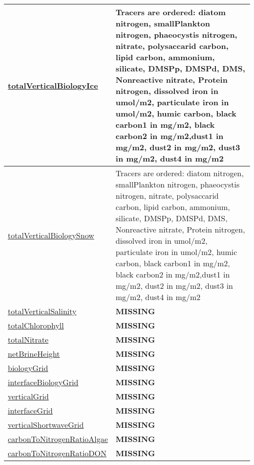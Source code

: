 {\begin{center}
\begin{longtable}{| p{2.0in} | p{4.0in} |}
    \hline
    \hyperref[subsec:var_sec_biogeochemistry_totalVerticalBiologyIce]{totalVerticalBiologyIce} & Tracers are ordered: diatom nitrogen, smallPlankton nitrogen, phaeocystis nitrogen, nitrate, polysaccarid carbon, lipid carbon, ammonium, silicate, DMSPp, DMSPd, DMS, Nonreactive nitrate, Protein nitrogen, dissolved iron in umol/m2, particulate iron in umol/m2, humic carbon, black carbon1 in mg/m2, black carbon2 in mg/m2,dust1 in mg/m2, dust2 in mg/m2, dust3 in mg/m2, dust4 in mg/m2 \\
    \hline
    \hyperref[subsec:var_sec_biogeochemistry_totalVerticalBiologySnow]{totalVerticalBiologySnow} & Tracers are ordered: diatom nitrogen, smallPlankton nitrogen, phaeocystis nitrogen, nitrate, polysaccarid carbon, lipid carbon, ammonium, silicate, DMSPp, DMSPd, DMS, Nonreactive nitrate, Protein nitrogen, dissolved iron in umol/m2, particulate iron in umol/m2, humic carbon, black carbon1 in mg/m2, black carbon2 in mg/m2,dust1 in mg/m2, dust2 in mg/m2, dust3 in mg/m2, dust4 in mg/m2 \\
    \hline
    \hyperref[subsec:var_sec_biogeochemistry_totalVerticalSalinity]{totalVerticalSalinity} & {\bf \color{red} MISSING} \\
    \hline
    \hyperref[subsec:var_sec_biogeochemistry_totalChlorophyll]{totalChlorophyll} & {\bf \color{red} MISSING} \\
    \hline
    \hyperref[subsec:var_sec_biogeochemistry_totalNitrate]{totalNitrate} & {\bf \color{red} MISSING} \\
    \hline
    \hyperref[subsec:var_sec_biogeochemistry_netBrineHeight]{netBrineHeight} & {\bf \color{red} MISSING} \\
    \hline
    \hyperref[subsec:var_sec_biogeochemistry_biologyGrid]{biologyGrid} & {\bf \color{red} MISSING} \\
    \hline
    \hyperref[subsec:var_sec_biogeochemistry_interfaceBiologyGrid]{interfaceBiologyGrid} & {\bf \color{red} MISSING} \\
    \hline
    \hyperref[subsec:var_sec_biogeochemistry_verticalGrid]{verticalGrid} & {\bf \color{red} MISSING} \\
    \hline
    \hyperref[subsec:var_sec_biogeochemistry_interfaceGrid]{interfaceGrid} & {\bf \color{red} MISSING} \\
    \hline
    \hyperref[subsec:var_sec_biogeochemistry_verticalShortwaveGrid]{verticalShortwaveGrid} & {\bf \color{red} MISSING} \\
    \hline
    \hyperref[subsec:var_sec_biogeochemistry_carbonToNitrogenRatioAlgae]{carbonToNitrogenRatioAlgae} & {\bf \color{red} MISSING} \\
    \hline
    \hyperref[subsec:var_sec_biogeochemistry_carbonToNitrogenRatioDON]{carbonToNitrogenRatioDON} & {\bf \color{red} MISSING} \\
    \hline
\end{longtable}
\end{center}
}
